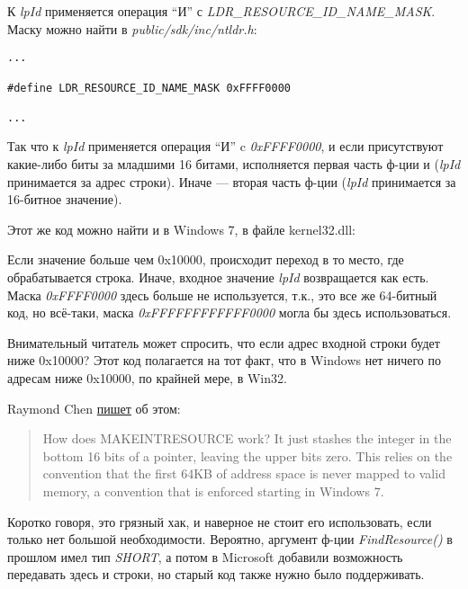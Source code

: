 К \emph{lpId} применяется операция ``И'' с \emph{LDR\_RESOURCE\_ID\_NAME\_MASK}. \\
Маску можно найти в \emph{public/sdk/inc/ntldr.h}:

\begin{lstlisting}[style=customc]
...

#define LDR_RESOURCE_ID_NAME_MASK 0xFFFF0000

...
\end{lstlisting}

Так что к \emph{lpId} применяется операция ``И'' c \emph{0xFFFF0000}, и если присутствуют какие-либо биты за младшими 16 битами,
исполняется первая часть ф-ции и (\emph{lpId} принимается за адрес строки).
Иначе --- вторая часть ф-ции (\emph{lpId} принимается за 16-битное значение).

Этот же код можно найти и в Windows 7, в файле kernel32.dll:



Если значение больше чем 0x10000, происходит переход в то место, где обрабатывается строка.
Иначе, входное значение \emph{lpId} возвращается как есть.
Маска \emph{0xFFFF0000} здесь больше не используется, т.к., это все же 64-битный код, но всё-таки,
маска \emph{0xFFFFFFFFFFFF0000} могла бы здесь использоваться.

Внимательный читатель может спросить, что если адрес входной строки будет ниже 0x10000?
Этот код полагается на тот факт, что в Windows нет ничего по адресам ниже 0x10000, по крайней мере, в Win32.

Raymond Chen \href{https://blogs.msdn.microsoft.com/oldnewthing/20130925-00/?p=3123}{пишет} об этом:

\begin{framed}
\begin{quotation}
How does MAKE­INT­RESOURCE work? It just stashes the integer in the bottom 16 bits of a pointer, leaving the upper bits zero. This relies on the convention that the first 64KB of address space is never mapped to valid memory, a convention that is enforced starting in Windows 7.
\end{quotation}
\end{framed}

Коротко говоря, это грязный хак, и наверное не стоит его использовать, если только нет большой необходимости.
Вероятно, аргумент ф-ции \emph{FindResource()} в прошлом имел тип \emph{SHORT}, а потом в Microsoft добавили возможность
передавать здесь и строки, но старый код также нужно было поддерживать.

